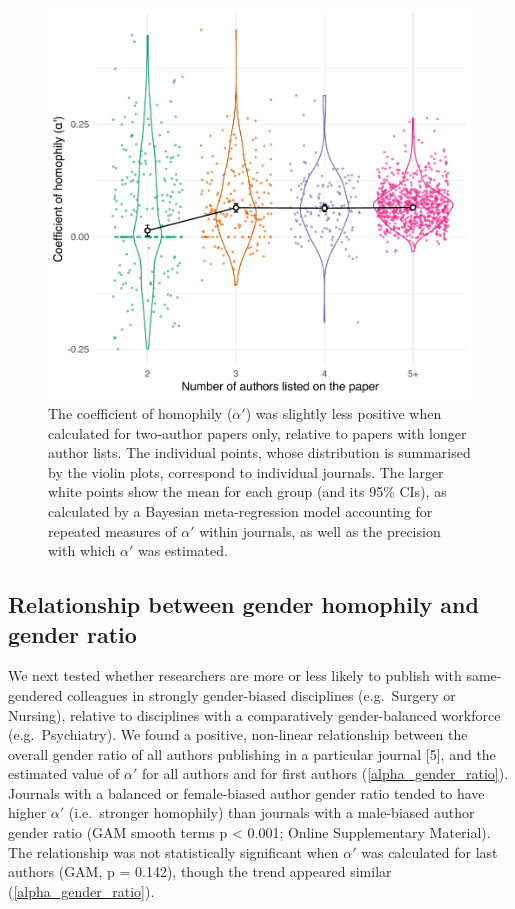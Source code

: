 \documentclass[12pt,]{article}
\begin{document}
\begin{figure}
\centering
\includegraphics{../figures/Fig3.pdf}
\caption{The coefficient of homophily (\(\alpha'\)) was slightly less
positive when calculated for two-author papers only, relative to papers
with longer author lists. The individual points, whose distribution is
summarised by the violin plots, correspond to individual journals. The
larger white points show the mean for each group (and its 95\% CIs), as
calculated by a Bayesian meta-regression model accounting for repeated
measures of \(\alpha'\) within journals, as well as the precision with
which \(\alpha'\) was estimated. \label{author_number}}
\end{figure}

\subsection{Relationship between gender homophily and gender
ratio}\label{relationship-between-gender-homophily-and-gender-ratio}

We next tested whether researchers are more or less likely to publish
with same-gendered colleagues in strongly gender-biased disciplines
(e.g.~Surgery or Nursing), relative to disciplines with a comparatively
gender-balanced workforce (e.g.~Psychiatry). We found a positive,
non-linear relationship between the overall gender ratio of all authors
publishing in a particular journal {[}5{]}, and the estimated value of
\(\alpha'\) for all authors and for first authors
(\autoref{alpha_gender_ratio}). Journals with a balanced or
female-biased author gender ratio tended to have higher \(\alpha'\)
(i.e.~stronger homophily) than journals with a male-biased author gender
ratio (GAM smooth terms p \textless{} 0.001; Online Supplementary
Material). The relationship was not statistically significant when
\(\alpha'\) was calculated for last authors (GAM, p = 0.142), though the
trend appeared similar (\autoref{alpha_gender_ratio}).
\end{document}
